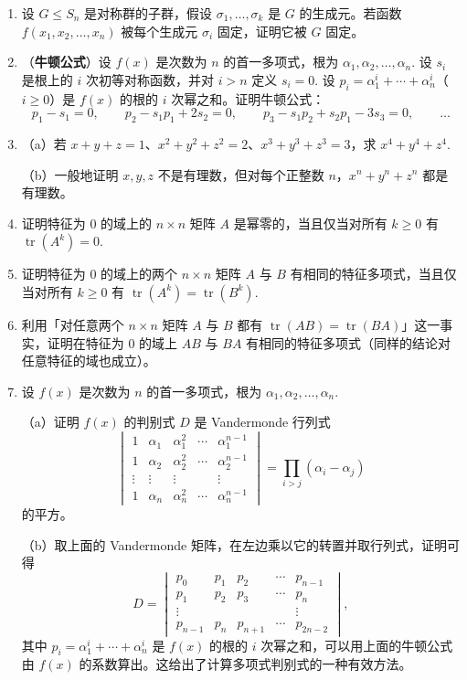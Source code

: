 \begin{enumerate}
\item 设 \(G \leq S_n\) 是对称群的子群，假设 \(\sigma_1, \ldots, \sigma_k\) 是 \(G\) 的生成元。若函数 \(f(x_1, x_2, \ldots, x_n)\) 被每个生成元 \(\sigma_i\) 固定，证明它被 \(G\) 固定。

\item （\textbf{牛顿公式}）设 \(f(x)\) 是次数为 \(n\) 的首一多项式，根为 \(\alpha_1, \alpha_2, \ldots, \alpha_n\). 设 \(s_i\) 是根上的 \(i\) 次初等对称函数，并对 \(i > n\) 定义 \(s_i = 0\). 设 \(p_i = \alpha_1^i+\cdots+\alpha_n^i\)（\(i \geq 0\)）是 \(f(x)\) 的根的 \(i\) 次幂之和。证明牛顿公式：
\[
p_1-s_1 = 0, \qquad p_2-s_1p_1+2s_2 = 0, \qquad p_3-s_1p_2+s_2p_1-3s_3 = 0, \qquad \ldots
\]

\item （a）若 \(x+y+z = 1\)、\(x^2+y^2+z^2 = 2\)、\(x^3+y^3+z^3 = 3\)，求 \(x^4+y^4+z^4\).

（b）一般地证明 \(x, y, z\) 不是有理数，但对每个正整数 \(n\)，\(x^n+y^n+z^n\) 都是有理数。

\item 证明特征为 0 的域上的 \(n \times n\) 矩阵 \(A\) 是幂零的，当且仅当对所有 \(k \geq 0\) 有 \(\operatorname{tr}(A^k) = 0\).

\item 证明特征为 0 的域上的两个 \(n \times n\) 矩阵 \(A\) 与 \(B\) 有相同的特征多项式，当且仅当对所有 \(k \geq 0\) 有 \(\operatorname{tr}(A^k) = \operatorname{tr}(B^k)\).

\item 利用「对任意两个 \(n \times n\) 矩阵 \(A\) 与 \(B\) 都有 \(\operatorname{tr}(AB) = \operatorname{tr}(BA)\)」这一事实，证明在特征为 0 的域上 \(AB\) 与 \(BA\) 有相同的特征多项式（同样的结论对任意特征的域也成立）。

\item 设 \(f(x)\) 是次数为 \(n\) 的首一多项式，根为 \(\alpha_1, \alpha_2, \ldots, \alpha_n\).

（a）证明 \(f(x)\) 的判别式 \(D\) 是 Vandermonde 行列式
\[
\begin{vmatrix}
1 & \alpha_1 & \alpha_1^2 & \cdots & \alpha_1^{n-1}\\
1 & \alpha_2 & \alpha_2^2 & \cdots & \alpha_2^{n-1}\\
\vdots & \vdots & \vdots & & \vdots\\
1 & \alpha_n & \alpha_n^2 & \cdots & \alpha_n^{n-1}
\end{vmatrix}
 = \prod_{i>j}(\alpha_i-\alpha_j)
\]
的平方。

（b）取上面的 Vandermonde 矩阵，在左边乘以它的转置并取行列式，证明可得
\[
D = \begin{vmatrix}
p_0 & p_1 & p_2 & \cdots & p_{n-1}\\
p_1 & p_2 & p_3 & \cdots & p_n\\
\vdots & & & & \vdots\\
p_{n-1} & p_n & p_{n+1} & \cdots & p_{2n-2}
\end{vmatrix},
\]
其中 \(p_i = \alpha_1^i+\cdots+\alpha_n^i\) 是 \(f(x)\) 的根的 \(i\) 次幂之和，可以用上面的牛顿公式由 \(f(x)\) 的系数算出。这给出了计算多项式判别式的一种有效方法。


\end{enumerate}
